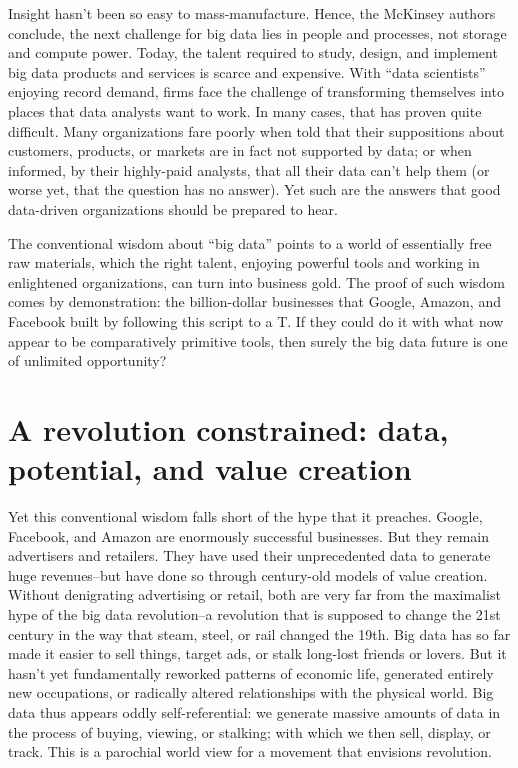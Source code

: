 \documentclass[12pt]{article}
\begin{document}
Insight hasn't been so easy to mass-manufacture. Hence, the
McKinsey authors conclude, the next challenge for big data lies in 
people and processes, not storage and compute power. Today, the talent
required to study, design, and implement big data products and
services is scarce and expensive. With ``data scientists'' enjoying
record demand, firms face the challenge of transforming themselves
into places that data analysts want to work. In many cases, that has
proven quite difficult. Many organizations fare poorly when told that
their suppositions about customers, products, or markets are in fact
not supported by data; or when informed, by their highly-paid
analysts, that all their data can't help them (or worse yet, that the
question has no answer). Yet such are the answers that good
data-driven organizations should be prepared to hear.

The conventional wisdom about ``big data'' points to a world of
essentially free raw materials, which the right talent, enjoying
powerful tools and working in enlightened organizations, can turn into
business gold. The proof of such wisdom comes by demonstration: the
billion-dollar businesses that Google, Amazon, and Facebook built by
following this script to a T. If they could do it with what now appear
to be comparatively primitive tools, then surely the big data future
is one of unlimited opportunity?


\section{A revolution constrained: data, potential, and value creation}
\label{sec:but-what-can}

Yet this conventional wisdom falls short of the hype that it
preaches. Google, Facebook, and Amazon are enormously successful
businesses. But they remain advertisers and retailers. They have used
their unprecedented data to generate huge revenues--but have done so
through century-old models of value creation. Without denigrating
advertising or retail, both are very far from the maximalist hype of
the big data revolution--a revolution that is supposed to change the
21st century in the way that steam, steel, or rail changed the
19th. Big data has so far made it easier to sell things, target ads,
or stalk long-lost friends or lovers. But it hasn't yet fundamentally
reworked patterns of economic life, generated entirely new
occupations, or radically altered relationships with the physical
world. Big data thus appears oddly self-referential: we generate
massive amounts of data in the process of buying, viewing, or
stalking; with which we then sell, display, or track. This is a
parochial world view for a movement that envisions revolution.
\end{document}
